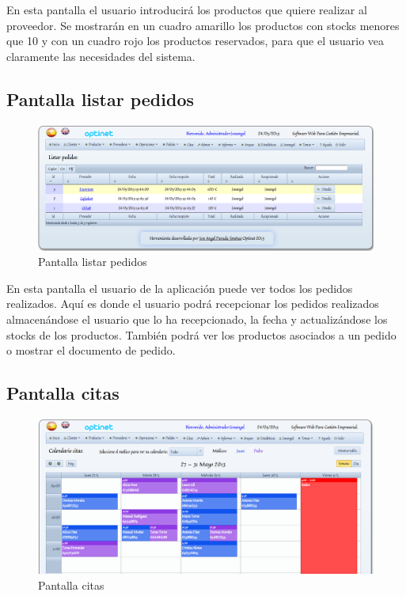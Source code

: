 \documentclass[a4paper,11pt]{book}
\begin{document}
En esta pantalla el usuario introducirá los productos que quiere realizar al proveedor. Se mostrarán en un cuadro amarillo los productos con stocks menores que 10 y con un cuadro rojo los productos reservados, para que el usuario vea claramente las necesidades del sistema.

\subsection {Pantalla listar pedidos}

\begin{figure}[!htb]
  \centering
    \includegraphics[scale=0.35]{caplistarpedidos.png}
  \caption{Pantalla listar pedidos}
  \label{a}
\end{figure}

En esta pantalla el usuario de la aplicación puede ver todos los pedidos realizados. Aquí es donde el usuario podrá recepcionar los pedidos realizados almacenándose el usuario que lo ha recepcionado, la fecha y actualizándose los stocks de los productos. También podrá ver los productos asociados a un pedido o mostrar el documento de pedido.

\subsection {Pantalla citas}

\begin{figure}[!htb]
  \centering
    \includegraphics[scale=0.35]{capcitas.png}
  \caption{Pantalla citas}
  \label{a}
\end{figure}
\end{document}
